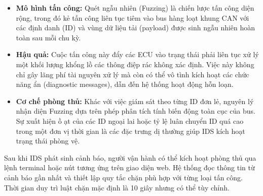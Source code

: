 
\begin{itemize}[leftmargin=*]
    \item \textbf{Mô hình tấn công:} Quét ngẫu nhiên (Fuzzing) là chiến lược tấn công diện rộng, trong đó kẻ tấn công liên tục tiêm vào bus hàng loạt khung CAN với các định danh (ID) và vùng dữ liệu tải (payload) được sinh ngẫu nhiên hoàn toàn sau mỗi chu kỳ.
    \item \textbf{Hậu quả:} Cuộc tấn công này đẩy các ECU vào trạng thái phải liên tục xử lý một khối lượng khổng lồ các thông điệp rác không xác định. Việc này không chỉ gây lãng phí tài nguyên xử lý mà còn có thể vô tình kích hoạt các chức năng ẩn (diagnostic messages), dẫn đến hệ thống hoạt động hỗn loạn.
    \item \textbf{Cơ chế phòng thủ:} Khác với việc giám sát theo từng ID đơn lẻ, nguyên lý nhận diện Fuzzing dựa trên phép phân tích tính biến động toàn cục của bus. Sự xuất hiện ồ ạt của các ID ngoại lai hoặc tỷ lệ luân chuyển ID quá cao trong một đơn vị thời gian là các đặc trưng dị thường giúp IDS kích hoạt trạng thái phòng vệ.
\end{itemize}




Sau khi IDS phát sinh cảnh báo, người vận hành có thể kích hoạt phòng thủ qua lệnh
terminal hoặc nút tương ứng trên giao diện web. Hệ thống đọc thông tin từ cảnh báo
gần nhất và thiết lập quy tắc chặn phù hợp với từng loại tấn công. Thời gian
duy trì luật chặn mặc định là 10 giây nhưng có thể tùy chỉnh.

